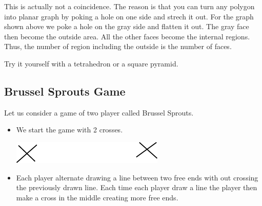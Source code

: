 \documentclass[a4paper, 12pt]{article}
\begin{document}
	
	This is actually not a coincidence. The reason is that you can turn any polygon into planar graph by poking a hole on one side and strech it out. For the graph shown above we poke a hole on the gray side and flatten it out. The gray face then become the outside area. All the other faces become the internal regions. Thus, the number of region including the outside is the number of faces.
	
	Try it yourself with a tetrahedron or a square pyramid.
	
	\subsection*{Brussel Sprouts Game}
	Let us consider a game of two player called Brussel Sprouts.
	\begin{itemize}
		\item We start the game with 2 crosses.	
		\begin{center}
		\includegraphics[width=0.3\linewidth]{brusselsproutend0}
		\end{center}
		\item Each player alternate drawing a line between two free ends with out crossing the previously drawn line. Each time each player draw a line the player then make a cross in the middle creating more free ends.
		

\end{itemize}
\end{document}
